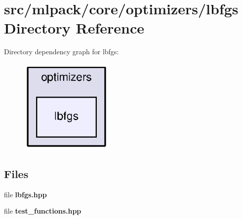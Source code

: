 \section{src/mlpack/core/optimizers/lbfgs Directory Reference}
\label{dir_8a431898e456b87398169d85cf9274bc}
Directory dependency graph for lbfgs\+:
\nopagebreak
\begin{figure}[H]
\begin{center}
\leavevmode
\includegraphics[width=130pt]{dir_8a431898e456b87398169d85cf9274bc_dep}
\end{center}
\end{figure}
\subsection*{Files}
\begin{DoxyCompactItemize}
\item 
file {\bf lbfgs.\+hpp}
\item 
file {\bf test\+\_\+functions.\+hpp}
\end{DoxyCompactItemize}
